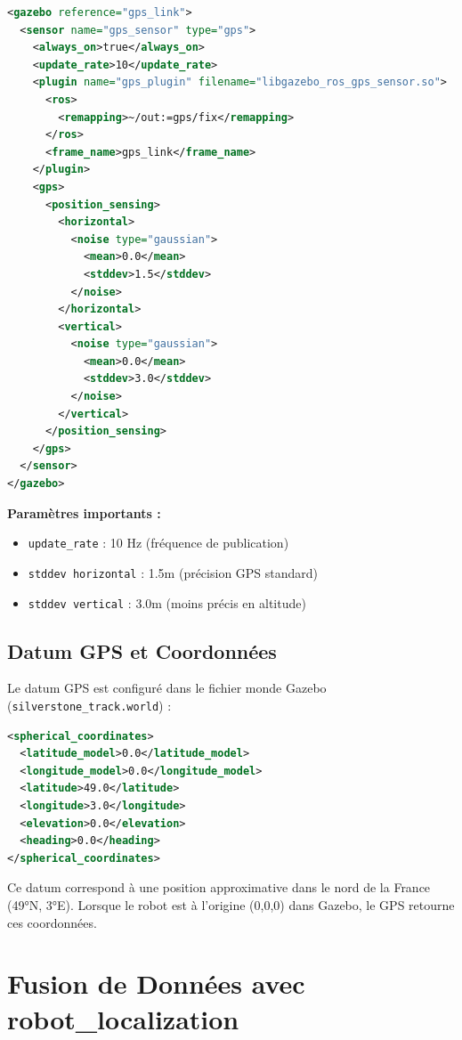 \documentclass[a4paper,12pt]{article}
\begin{document}
\begin{lstlisting}[language=XML, caption=Configuration du Plugin GPS]
<gazebo reference="gps_link">
  <sensor name="gps_sensor" type="gps">
    <always_on>true</always_on>
    <update_rate>10</update_rate>
    <plugin name="gps_plugin" filename="libgazebo_ros_gps_sensor.so">
      <ros>
        <remapping>~/out:=gps/fix</remapping>
      </ros>
      <frame_name>gps_link</frame_name>
    </plugin>
    <gps>
      <position_sensing>
        <horizontal>
          <noise type="gaussian">
            <mean>0.0</mean>
            <stddev>1.5</stddev>
          </noise>
        </horizontal>
        <vertical>
          <noise type="gaussian">
            <mean>0.0</mean>
            <stddev>3.0</stddev>
          </noise>
        </vertical>
      </position_sensing>
    </gps>
  </sensor>
</gazebo>
\end{lstlisting}

\textbf{Paramètres importants :}
\begin{itemize}
    \item \texttt{update\_rate} : 10 Hz (fréquence de publication)
    \item \texttt{stddev horizontal} : 1.5m (précision GPS standard)
    \item \texttt{stddev vertical} : 3.0m (moins précis en altitude)
\end{itemize}

\subsection{Datum GPS et Coordonnées}

Le datum GPS est configuré dans le fichier monde Gazebo (\texttt{silverstone\_track.world}) :

\begin{lstlisting}[language=XML, caption=Configuration Spherical Coordinates]
<spherical_coordinates>
  <latitude_model>0.0</latitude_model>
  <longitude_model>0.0</longitude_model>
  <latitude>49.0</latitude>
  <longitude>3.0</longitude>
  <elevation>0.0</elevation>
  <heading>0.0</heading>
</spherical_coordinates>
\end{lstlisting}

Ce datum correspond à une position approximative dans le nord de la France (49°N, 3°E). Lorsque le robot est à l'origine (0,0,0) dans Gazebo, le GPS retourne ces coordonnées.

\section{Fusion de Données avec robot\_localization}
\end{document}

